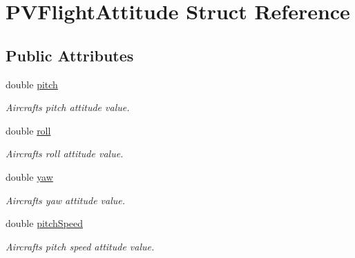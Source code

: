 \hypertarget{struct_p_v_flight_attitude}{}\section{P\+V\+Flight\+Attitude Struct Reference}
\label{struct_p_v_flight_attitude}
\subsection*{Public Attributes}
\begin{DoxyCompactItemize}
\item 
\mbox{\label{struct_p_v_flight_attitude_a03829cd99af1861d92c0af1d23dda8d1}} 
double \hyperlink{struct_p_v_flight_attitude_a03829cd99af1861d92c0af1d23dda8d1}{pitch}
\begin{DoxyCompactList}\small\item\em Aircraft\textquotesingle{}s pitch attitude value. \end{DoxyCompactList}\item 
\mbox{\label{struct_p_v_flight_attitude_a288f06948d8d0c6d028b7ff2874619e5}} 
double \hyperlink{struct_p_v_flight_attitude_a288f06948d8d0c6d028b7ff2874619e5}{roll}
\begin{DoxyCompactList}\small\item\em Aircraft\textquotesingle{}s roll attitude value. \end{DoxyCompactList}\item 
\mbox{\label{struct_p_v_flight_attitude_a383355c5a5ad6c6e95bfc10acb1aabca}} 
double \hyperlink{struct_p_v_flight_attitude_a383355c5a5ad6c6e95bfc10acb1aabca}{yaw}
\begin{DoxyCompactList}\small\item\em Aircraft\textquotesingle{}s yaw attitude value. \end{DoxyCompactList}\item 
\mbox{\label{struct_p_v_flight_attitude_a3b67b96ad8318deed30585fdd4965956}} 
double \hyperlink{struct_p_v_flight_attitude_a3b67b96ad8318deed30585fdd4965956}{pitch\+Speed}
\begin{DoxyCompactList}\small\item\em Aircraft\textquotesingle{}s pitch speed attitude value. \end{DoxyCompactList}\item 

\end{DoxyCompactItemize}

